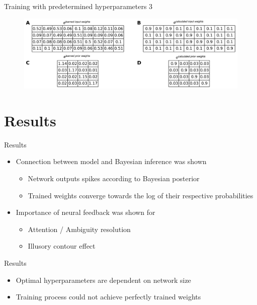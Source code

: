 \documentclass[aspectratio=169]{beamer}
\begin{document}
\begin{frame}{Training with predetermined hyperparameters 3}
 \vspace{-1.0cm}
		\begin{figure}
        \includegraphics[width=0.7\linewidth]{../Latex/figures/1D/training/weightComparison.png}
      \end{figure} 
\end{frame}

\section{Results}

\begin{frame}{Results}
	\vspace{-0.5cm}
    \begin{itemize}    
    \item Connection between model and Bayesian inference was shown
    \begin{itemize}
      \item Network outputs spikes according to Bayesian posterior
      \item Trained weights converge towards the log of their respective probabilities
    \end{itemize}
    \item Importance of neural feedback was shown for 
    \begin{itemize}
	  \item Attention / Ambiguity resolution
	  \item Illusory contour effect
    \end{itemize}   
  \end{itemize}
\end{frame}

\begin{frame}{Results}
  \begin{itemize}
      \item Optimal hyperparameters are dependent on network size
    \item Training process could not achieve perfectly trained weights 
  \end{itemize}
\end{frame}
\end{document}
